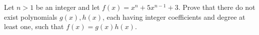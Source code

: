 Let $n>1$ be an integer and let $f(x)=x^{n}+5x^{n-1}+3$. Prove that there do not exist polynomials $g(x),h(x)$, each having integer coefficients and degree at least one, such that $f(x)=g(x)h(x)$.
